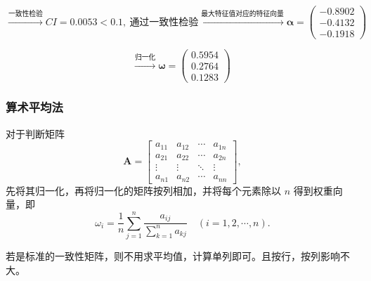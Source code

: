 \documentclass[12pt,a4paper]{article} %
\begin{document}
\[
\xrightarrow{\text{一致性检验}} 
CI = 0.0053 < 0.1,\ \text{通过一致性检验} 
\xrightarrow{\text{最大特征值对应的特征向量}} 
\boldsymbol{\alpha} = \begin{pmatrix}
-0.8902 \\
-0.4132 \\
-0.1918
\end{pmatrix}
\]

\[
\xrightarrow{\text{归一化}} 
\boldsymbol{\omega} = \begin{pmatrix}
0.5954 \\
0.2764 \\
0.1283
\end{pmatrix} 
\ 
\]
\subsubsection{算术平均法}
对于判断矩阵
\[
\boldsymbol{A} = \begin{bmatrix}
a_{11} & a_{12} & \cdots & a_{1n} \\
a_{21} & a_{22} & \cdots & a_{2n} \\
\vdots & \vdots & \ddots & \vdots \\
a_{n1} & a_{n2} & \cdots & a_{nn}
\end{bmatrix},
\]
先将其归一化，再将归一化的矩阵按列相加，并将每个元素除以 \( n \) 得到权重向量，即
\[
\omega_i = \frac{1}{n} \sum_{j=1}^{n} \frac{a_{ij}}{\sum_{k=1}^{n} a_{kj}} \quad (i = 1, 2, \cdots, n).
\]
\begin{markdownquote}
    若是标准的一致性矩阵，则不用求平均值，计算单列即可。且按行，按列影响不大。
\end{markdownquote}
\end{document}
